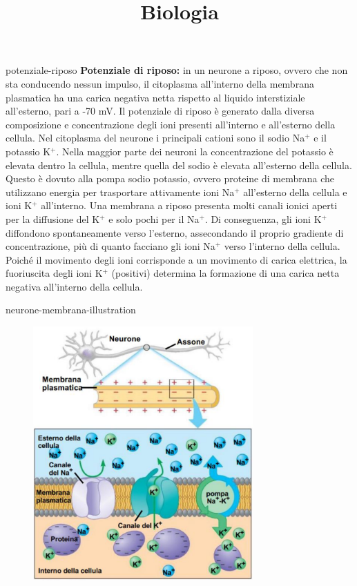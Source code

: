 \documentclass[preview]{standalone}
\begin{document}
\title{Biologia}
\genpage


\begin{snippet}{potenziale-riposo}
    \textbf{Potenziale di riposo:} in un neurone a riposo, ovvero che non sta conducendo nessun impulso, il citoplasma
all'interno della membrana plasmatica ha una carica negativa netta rispetto al liquido
interstiziale all'esterno, pari a -70 mV. Il potenziale di riposo è generato dalla diversa
composizione e concentrazione degli ioni presenti all'interno e all'esterno della cellula. Nel
citoplasma del neurone i principali cationi sono il sodio Na\({}^+\) e il potassio K\({}^+\). Nella maggior
parte dei neuroni la concentrazione del potassio è elevata dentro la cellula, mentre quella
del sodio è elevata all'esterno della cellula. Questo è dovuto alla pompa sodio potassio,
ovvero proteine di membrana che utilizzano energia per trasportare attivamente ioni Na\({}^+\)
all'esterno della cellula e ioni K\({}^+\) all'interno. Una membrana a riposo presenta molti canali
ionici aperti per la diffusione del K\({}^+\) e solo pochi per il Na\({}^+\). Di conseguenza, gli ioni K\({}^+\)
diffondono spontaneamente verso l'esterno, assecondando il proprio gradiente di
concentrazione, più di quanto facciano gli ioni Na\({}^+\) verso l'interno della cellula. Poiché il
movimento degli ioni corrisponde a un movimento di carica elettrica, la fuoriuscita degli ioni
K\({}^+\) (positivi) determina la formazione di una carica netta negativa all'interno della cellula.
\end{snippet}

\begin{snippet}{neurone-membrana-illustration}
    \begin{center}
    \begin{figure}[ht]
        \centering
        \includegraphics[width=0.75\textwidth]{./resources/neurone_membrana.png}
    \end{figure}
    \end{center}
\end{snippet}
\end{document}
